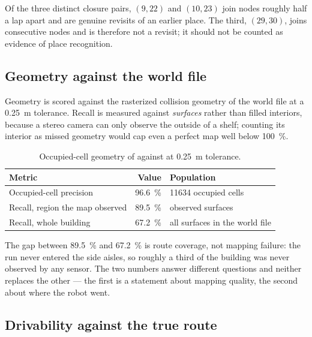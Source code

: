 Of the three distinct closure pairs, $(9,22)$ and $(10,23)$ join nodes roughly
half a lap apart and are genuine revisits of an earlier place. The third,
$(29,30)$, joins consecutive nodes and is therefore not a revisit; it should not
be counted as evidence of place recognition.

\subsection{Geometry against the world file}

Geometry is scored against the rasterized collision geometry of the world file at
a \SI{0.25}{\metre} tolerance. Recall is measured against \emph{surfaces} rather
than filled interiors, because a stereo camera can only observe the outside of a
shelf; counting its interior as missed geometry would cap even a perfect map well
below \SI{100}{\percent}.

\begin{table}[htbp]
\centering
\caption{Occupied-cell geometry of  against
 at \SI{0.25}{\metre} tolerance.}
\label{tab:map-geometry}
\small
\begin{tabularx}{\textwidth}{>{\raggedright\arraybackslash}p{}r>{\raggedright\arraybackslash}X}
\toprule
Metric & Value & Population \\
\midrule
Occupied-cell precision & \SI{96.6}{\percent} & \num{11634} occupied cells \\
Recall, region the map observed & \SI{89.5}{\percent} & observed surfaces \\
Recall, whole building & \SI{67.2}{\percent} & all surfaces in the world file \\
\bottomrule
\end{tabularx}
\end{table}

The gap between \SI{89.5}{\percent} and \SI{67.2}{\percent} is route coverage, not
mapping failure: the run never entered the side aisles, so roughly a third of the
building was never observed by any sensor. The two numbers answer different
questions and neither replaces the other --- the first is a statement about
mapping quality, the second about where the robot went.

\subsection{Drivability against the true route}
\label{sec:map-drivability}

